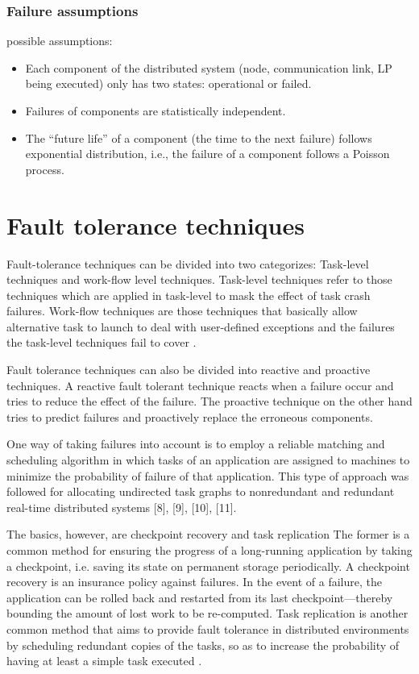 \documentclass{cslthse-msc}
\begin{document}
 
 \subsubsection{Failure assumptions}
 possible assumptions:
 \begin{itemize}
  \item  Each component of the distributed system (node, communication link, LP being executed) only has two states: operational or failed.
 \item Failures of components are statistically independent.
 \item The “future life” of a component (the time to the next failure) follows exponential distribution, i.e., the failure of a component follows a Poisson process.
 \end{itemize}

 
 
 \section{Fault tolerance techniques}
Fault-tolerance techniques can be divided into two categorizes:
Task-level techniques and work-flow level techniques.
Task-level techniques refer to those techniques which are applied in task-level to mask the effect of task crash failures. Work-flow techniques are those techniques that basically allow alternative task to launch to deal with user-defined exceptions and the failures the task-level techniques fail to cover \cite{gridWorkflow}.

Fault tolerance techniques can also be divided into reactive and proactive techniques. A reactive fault tolerant technique reacts when a failure occur and tries to reduce the effect of the failure. The proactive technique on the other hand tries to predict failures and proactively replace the erroneous components.

One way of taking failures into account is to employ a reliable matching and scheduling algorithm in which tasks of an application are assigned to machines to minimize the probability of failure of that application. This type of approach was followed for allocating undirected task graphs to nonredundant and redundant real-time distributed systems [8], [9], [10], [11].

The basics, however, are checkpoint recovery and task replication The former is a common method for ensuring the progress of a long-running application by taking a checkpoint, i.e. saving its state on permanent storage periodically. A checkpoint recovery is an insurance policy against failures. In the event of a failure, the application can be rolled back and restarted from its last checkpoint—thereby bounding the amount of lost work to be re-computed. Task replication is another common method that aims to provide fault tolerance in distributed environments by scheduling redundant copies of the tasks, so as to increase the probability of having at least a simple task executed  \cite{effTaskReplMobGrid}. 
\end{document}

